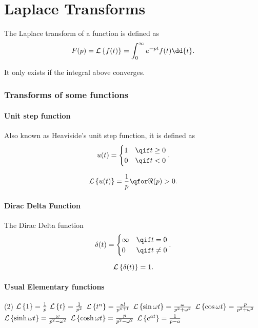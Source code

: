 \part{Laplace Transforms}
The Laplace transform of a function is defined as
\[
    F(p)=\La{f(t)} = \int_0^\infty e^{-pt} f(t) \dd{t}
.\] 

It only exists if the integral above converges.\\

\section{Transforms of some functions}

\subsection{Unit step function}

Also known as Heaviside's unit step function, it is defined as 
\[
    u(t) = \begin{cases} 1 &\qif t\ge 0\\
    0&\qif t<0\end{cases}
.\] 

\[
    \La{u(t)} = \frac{1}{p} \qfor \Re(p) >0
.\] 

\subsection{Dirac Delta Function}
The Dirac Delta function 
\[
    \delta(t) = \begin{cases} \infty &\qif t= 0\\
    0&\qif t\neq 0\end{cases}
.\] 

\[
    \mathcal{L} \left\{ \delta(t) \right\} = 1
.\] 
\subsection{Usual Elementary functions}

\begin{tasks}(2)
    \task $\mathcal{L} \left\{ 1 \right\} = \frac{1}{p}$ 
    \task $\mathcal{L} \left\{ t \right\} = \frac{1}{p^2}$ 
    \task $\mathcal{L} \left\{ t^n \right\} = \frac{n!}{p^{n+1}}$
    \task $\mathcal{L} \left\{ \sin \omega t \right\} = \frac{\omega}{p^2+\omega^2}$
    \task $\mathcal{L} \left\{ \cos \omega t \right\} = \frac{p}{p^2+\omega^2}$
    \task $\mathcal{L} \left\{ \sinh \omega t \right\} = \frac{\omega}{p^2-\omega^2}$
    \task $\mathcal{L} \left\{ \cosh \omega t \right\} = \frac{p}{p^2-\omega^2}$
    \task $\mathcal{L} \left\{ e^{at} \right\} = \frac{1}{p-a}$
\end{tasks}

